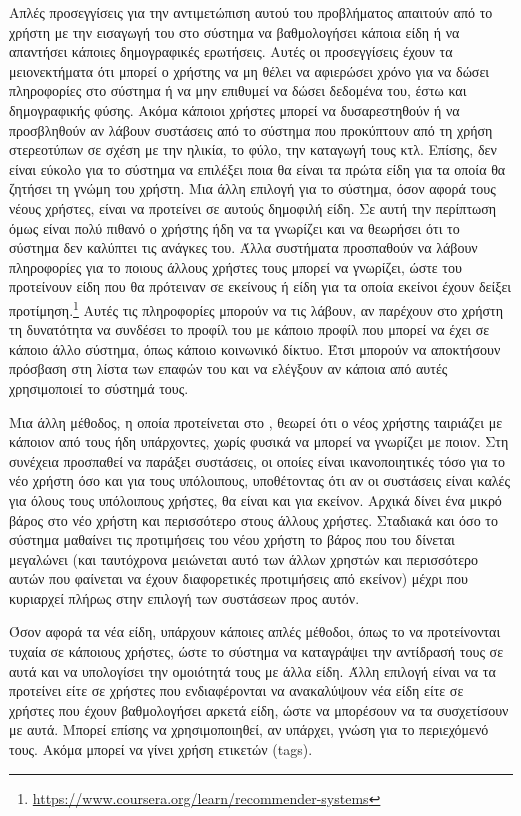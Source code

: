 Απλές προσεγγίσεις για την αντιμετώπιση αυτού του προβλήματος απαιτούν από το χρήστη με την εισαγωγή του στο σύστημα να βαθμολογήσει κάποια είδη ή να απαντήσει κάποιες δημογραφικές ερωτήσεις. Αυτές οι προσεγγίσεις έχουν τα μειονεκτήματα ότι μπορεί ο χρήστης να μη θέλει να αφιερώσει χρόνο για να δώσει πληροφορίες στο σύστημα ή να μην επιθυμεί να δώσει δεδομένα του, έστω και δημογραφικής φύσης. Ακόμα κάποιοι χρήστες μπορεί να δυσαρεστηθούν ή να προσβληθούν αν λάβουν συστάσεις από το σύστημα που προκύπτουν από τη χρήση στερεοτύπων σε σχέση με την ηλικία, το φύλο, την καταγωγή τους κτλ.\cite{ricci2011recommender} Επίσης, δεν είναι εύκολο για το σύστημα να επιλέξει ποια θα είναι τα πρώτα είδη για τα οποία θα ζητήσει τη γνώμη του χρήστη. Μια άλλη επιλογή για το σύστημα, όσον αφορά τους νέους χρήστες, είναι να προτείνει σε αυτούς δημοφιλή είδη. Σε αυτή την περίπτωση όμως είναι πολύ πιθανό ο χρήστης ήδη να τα γνωρίζει και να θεωρήσει ότι το σύστημα δεν καλύπτει τις ανάγκες του. Άλλα συστήματα προσπαθούν να λάβουν πληροφορίες για το ποιους άλλους χρήστες τους μπορεί να γνωρίζει, ώστε του προτείνουν είδη που θα πρότειναν σε εκείνους ή είδη για τα οποία εκείνοι έχουν δείξει προτίμηση.\footnote{\en \url{https://www.coursera.org/learn/recommender-systems}} Αυτές τις πληροφορίες μπορούν να τις λάβουν, αν παρέχουν στο χρήστη τη δυνατότητα να συνδέσει το προφίλ του με κάποιο προφίλ που μπορεί να έχει σε κάποιο άλλο σύστημα, όπως κάποιο κοινωνικό δίκτυο. Έτσι μπορούν να αποκτήσουν πρόσβαση στη λίστα των επαφών του και να ελέγξουν αν κάποια από αυτές χρησιμοποιεί το σύστημά τους. \par
Μια άλλη μέθοδος, η οποία προτείνεται στο \cite{DBLP:conf/um/Masthoff03}, θεωρεί ότι ο νέος χρήστης ταιριάζει με κάποιον από τους ήδη υπάρχοντες, χωρίς φυσικά να μπορεί να γνωρίζει με ποιον. Στη συνέχεια προσπαθεί να παράξει συστάσεις, οι οποίες είναι ικανοποιητικές τόσο για το νέο χρήστη όσο και για τους υπόλοιπους, υποθέτοντας ότι αν οι συστάσεις είναι καλές για όλους τους υπόλοιπους χρήστες, θα είναι και για εκείνον. Αρχικά δίνει ένα μικρό βάρος στο νέο χρήστη και περισσότερο στους άλλους χρήστες. Σταδιακά και όσο το σύστημα μαθαίνει τις προτιμήσεις του νέου χρήστη το βάρος που του δίνεται μεγαλώνει (και ταυτόχρονα μειώνεται αυτό των άλλων χρηστών και περισσότερο αυτών που φαίνεται να έχουν διαφορετικές προτιμήσεις από εκείνον) μέχρι που κυριαρχεί πλήρως στην επιλογή των συστάσεων προς αυτόν.\par
Όσον αφορά τα νέα είδη, υπάρχουν κάποιες απλές μέθοδοι, όπως το να προτεί\-νονται τυχαία σε κάποιους χρήστες, ώστε το σύστημα να καταγράψει την αντίδρασή τους σε αυτά και να υπολογίσει την ομοιότητά τους με άλλα είδη. Άλλη επιλογή είναι να τα προτείνει είτε σε χρήστες που ενδιαφέρονται να ανακαλύψουν νέα είδη είτε σε χρήστες που έχουν βαθμολογήσει αρκετά είδη, ώστε να μπορέσουν να τα συσχετίσουν με αυτά. Μπορεί επίσης να χρησιμοποιηθεί, αν υπάρχει, γνώση για το περιεχόμενό τους. Ακόμα μπορεί να γίνει χρήση ετικετών ({\en tags}). \par
